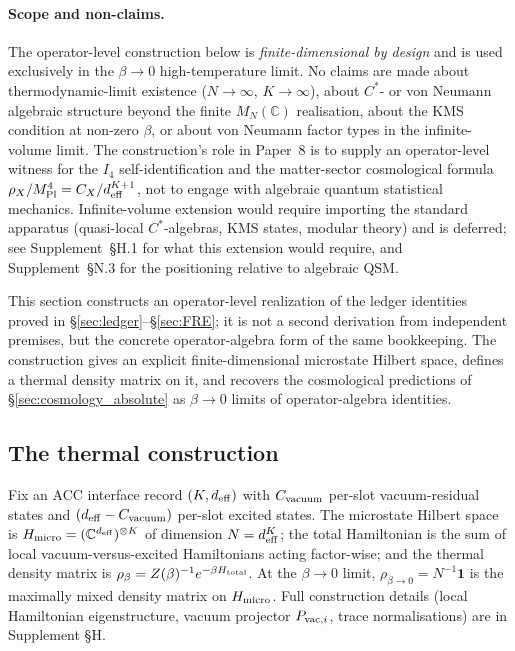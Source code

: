 \documentclass[11pt]{article}
\newcommand{\Mpl}{M_{\rm Pl}}
\begin{document}
\paragraph{Scope and non-claims.}  The operator-level construction below is \emph{finite-dimensional by design} and is used exclusively in the $\beta \to 0$ high-temperature limit.  No claims are made about thermodynamic-limit existence ($N \to \infty$, $K \to \infty$), about $C^*$- or von Neumann algebraic structure beyond the finite $M_N(\mathbb{C})$ realisation, about the KMS condition at non-zero $\beta$, or about von Neumann factor types in the infinite-volume limit.  The construction's role in Paper~8 is to supply an operator-level witness for the $I_4$ self-identification and the matter-sector cosmological formula $\rho_X / \Mpl^4 = C_X / d_{\rm eff}^{K+1}$, not to engage with algebraic quantum statistical mechanics.  Infinite-volume extension would require importing the standard apparatus (quasi-local $C^*$-algebras, KMS states, modular theory) and is deferred; see Supplement~\S H.1 for what this extension would require, and Supplement~\S N.3 for the positioning relative to algebraic QSM.

This section constructs an operator-level realization of the ledger identities proved in \S\ref{sec:ledger}--\S\ref{sec:FRE}; it is not a second derivation from independent premises, but the concrete operator-algebra form of the same bookkeeping. The construction gives an explicit finite-dimensional microstate Hilbert space, defines a thermal density matrix on it, and recovers the cosmological predictions of \S\ref{sec:cosmology_absolute} as $\beta \to 0$ limits of operator-algebra identities.

\subsection{The thermal construction}\label{sec:operator_construction}

Fix an ACC interface record $(K, d_{\rm eff})$ with $C_{\rm vacuum}$ per-slot vacuum-residual states and $(d_{\rm eff} - C_{\rm vacuum})$ per-slot excited states.  The microstate Hilbert space is $H_{\rm micro} = (\mathbb{C}^{d_{\rm eff}})^{\otimes K}$ of dimension $N = d_{\rm eff}^K$; the total Hamiltonian is the sum of local vacuum-versus-excited Hamiltonians acting factor-wise; and the thermal density matrix is $\rho_\beta = Z(\beta)^{-1} e^{-\beta H_{\rm total}}$.  At the $\beta \to 0$ limit, $\rho_{\beta \to 0} = N^{-1}\mathbf{1}$ is the maximally mixed density matrix on $H_{\rm micro}$.  Full construction details (local Hamiltonian eigenstructure, vacuum projector $P_{{\rm vac},i}$, trace normalisations) are in Supplement \S H.
\end{document}
